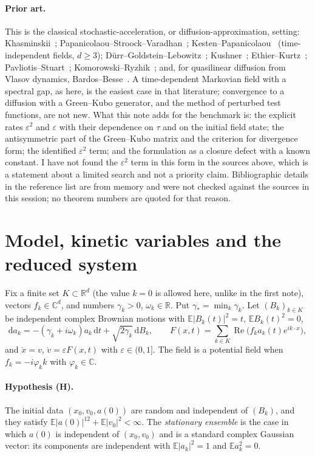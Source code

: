 \documentclass[11pt]{article}
\newcommand{\dd}{\mathrm{d}}
\newcommand{\E}{\mathbb{E}}
\newcommand{\eps}{\varepsilon}
\newcommand{\R}{\mathbb{R}}
\newcommand{\C}{\mathbb{C}}
\renewcommand{\Re}{\operatorname{Re}}
\theoremstyle{remark}
\begin{document}
\paragraph{Prior art.} {\sloppy This is the classical stochastic-acceleration, or
diffusion-approximation, setting: Khasminskii~\cite{Khas};
Papanicolaou--Stroock--Varadhan~\cite{PSV};
Kesten--Papanicolaou~\cite{KP} (time-independent fields, $d\ge3$);
D\"urr--Goldstein--Lebowitz~\cite{DGL}; Kushner~\cite{Kushner};
Ethier--Kurtz~\cite{EK}; Pavliotis--Stuart~\cite{PS};
Komorowski--Ryzhik~\cite{KR}; and, for quasilinear diffusion from Vlasov
dynamics, Bardos--Besse~\cite{BB}. A time-dependent Markovian field with a
spectral gap, as here, is the easiest case in that literature; convergence
to a diffusion with a Green--Kubo generator, and the method of perturbed
test functions, are not new. What this note adds for the benchmark is: the
explicit rates $\eps^2$ and $\eps$ with their dependence on $\tau$ and on
the initial field state; the antisymmetric part of the Green--Kubo matrix
and the criterion for divergence form; the identified $\eps^2$ term; and the
formulation as a closure defect with a known constant. I have not found the
$\eps^2$ term in this form in the sources above, which is a statement about
a limited search and not a priority claim. Bibliographic details in the
reference list are from memory and were not checked against the sources in
this session; no theorem numbers are quoted for that reason.\par}

\section{Model, kinetic variables and the reduced system}

Fix a finite set $K\subset\R^d$ (the value $k=0$ is allowed here, unlike in
the first note), vectors $f_k\in\C^d$, and numbers $\gamma_k>0$,
$\omega_k\in\R$. Put $\gamma_*=\min_k\gamma_k$. Let $(B_k)_{k\in K}$ be
independent complex Brownian motions with $\E|B_k(t)|^2=t$, $\E B_k(t)^2=0$,
\[
  \dd a_k=-(\gamma_k+i\omega_k)a_k\,\dd t+\sqrt{2\gamma_k}\,\dd B_k,\qquad
  F(x,t)=\sum_{k\in K}\Re\bigl(f_ka_k(t)e^{ik\cdot x}\bigr),
\]
and $\dot x=v$, $\dot v=\eps F(x,t)$ with $\eps\in(0,1]$. The field is a
potential field when $f_k=-i\varphi_kk$ with $\varphi_k\in\C$.

\paragraph{Hypothesis (H).} The initial data $(x_0,v_0,a(0))$ are random
and independent of $(B_k)$, and they satisfy
$\E|a(0)|^{12}+\E|v_0|^2<\infty$.
The \emph{stationary ensemble} is the case in which $a(0)$ is independent
of $(x_0,v_0)$ and is a standard complex Gaussian vector: its components
are independent with $\E|a_k|^2=1$ and $\E a_k^2=0$.
\end{document}
